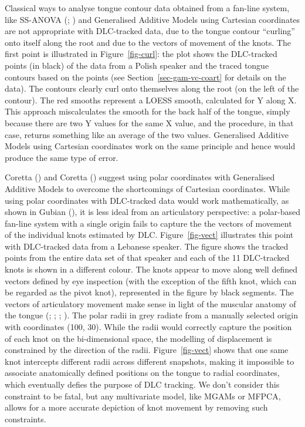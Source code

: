 \documentclass[
  man,
  longtable,
  nolmodern,
  notxfonts,
  notimes,
  colorlinks=true,linkcolor=blue,citecolor=blue,urlcolor=blue]{apa7}
\begin{document}
Classical ways to analyse tongue contour data obtained from a fan-line
system, like SS-ANOVA (;
) and Generalised Additive
Models using Cartesian coordinates are not appropriate with DLC-tracked
data, due to the tongue contour ``curling'' onto itself along the root
and due to the vectors of movement of the knots. The first point is
illustrated in Figure~\ref{fig-curl}: the plot shows the DLC-tracked
points (in black) of the data from a Polish speaker and the traced
tongue contours based on the points (see Section~\ref{sec-gam-vc-coart}
for details on the data). The contours clearly curl onto themselves
along the root (on the left of the contour). The red smooths represent a
LOESS smooth, calculated for Y along X. This approach miscalculates the
smooth for the back half of the tongue, simply because there are two Y
values for the same X value, and the procedure, in that case, returns
something like an average of the two values. Generalised Additive Models
using Cartesian coordinates work on the same principle and hence would
produce the same type of error.

Coretta () and Coretta
() suggest using polar coordinates with
Generalised Additive Models to overcome the shortcomings of Cartesian
coordinates. While using polar coordinates with DLC-tracked data would
work mathematically, as shown in Gubian
(), it is less ideal from an articulatory
perspective: a polar-based fan-line system with a single origin fails to
capture the the vectors of movement of the individual knots estimated by
DLC. Figure~\ref{fig-vect} illustrates this point with DLC-tracked data
from a Lebanese speaker. The figure shows the tracked points from the
entire data set of that speaker and each of the 11 DLC-tracked knots is
shown in a different colour. The knots appear to move along well defined
vectors defined by eye inspection (with the exception of the fifth knot,
which can be regarded as the pivot knot), represented in the figure by
black segments. The vectors of articulatory movement make sense in light
of the muscular anatomy of the tongue (; ;
;
). The polar radii in grey
radiate from a manually selected origin with coordinates (100, 30).
While the radii would correctly capture the position of each knot on the
bi-dimensional space, the modelling of displacement is constrained by
the direction of the radii. Figure~\ref{fig-vect} shows that one same
knot intercepts different radii across different snapshots, making it
impossible to associate anatomically defined positions on the tongue to
radial coordinates, which eventually defies the purpose of DLC tracking.
We don't consider this constraint to be fatal, but any multivariate
model, like MGAMs or MFPCA, allows for a more accurate depiction of knot
movement by removing such constraints.
\end{document}
